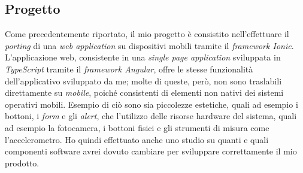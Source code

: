 \subsection{Progetto}

Come precedentemente riportato, il mio progetto è consistito nell'effettuare il \textit{porting} di una \textit{web application} su dispositivi mobili tramite il \textit{framework Ionic}. L'applicazione web, consistente in una \textit{single page application} sviluppata in \textit{TypeScript} tramite il \textit{framework Angular}, offre le stesse funzionalità dell'applicativo sviluppato da me; molte di queste, però, non sono traslabili direttamente su \textit{mobile}, poiché consistenti di elementi non nativi dei sistemi operativi mobili. Esempio di ciò sono sia piccolezze estetiche, quali ad esempio i bottoni, i \textit{form} e gli \textit{alert}, che l'utilizzo delle risorse hardware del sistema, quali ad esempio la fotocamera, i bottoni fisici e gli strumenti di misura come l'accelerometro. Ho quindi effettuato anche uno studio su quanti e quali componenti software avrei dovuto cambiare per sviluppare correttamente il mio prodotto.

